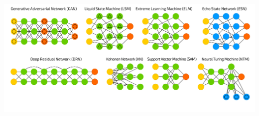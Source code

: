 \documentclass[12pt, aspectratio = 169]{beamer}
\begin{document}
\begin{frame}[c]
\begin{columns}
		\vspace{2em}
		\includegraphics[width=1\linewidth]{networkZooPoster_3}
	\end{columns}
\end{frame}

\end{document}
